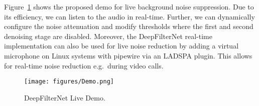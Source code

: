 \documentclass{INTERSPEECH2023}
\begin{document}
Figure~\ref{fig:demo} shows the proposed demo for live background noise suppression.
Due to its efficiency, we can listen to the audio in real-time.
Further, we can dynamically configure the noise attenuation and modify thresholds where the first and second denoising stage are disabled.
Moreover, the DeepFilterNet real-time implementation can also be used for live noise reduction by adding a virtual microphone on Linux systems with pipewire via an LADSPA plugin.
This allows for real-time noise reduction e.g.~during video calls.

\begin{figure}
  \centering
  \texttt{[image: figures/Demo.png]}
  \caption{DeepFilterNet Live Demo.}
  \vspace{-.9em}
  \label{fig:demo}
\end{figure}




\end{document}

